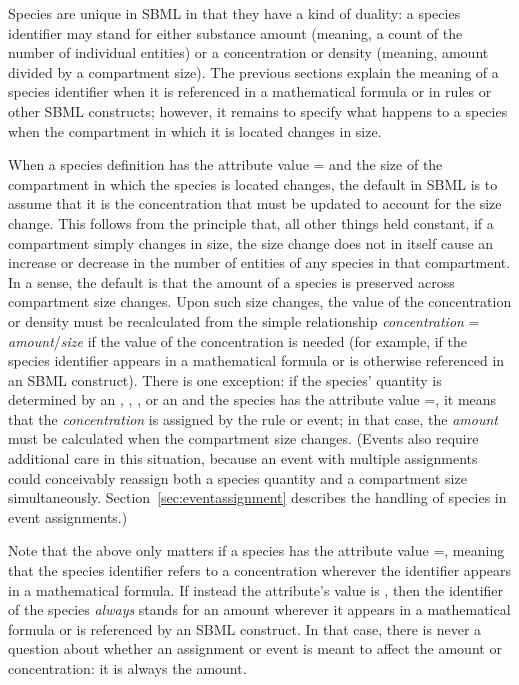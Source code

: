 Species are unique in SBML in that they have a kind of duality: a
species identifier may stand for either substance amount (meaning,
a count of the number of individual entities) or a concentration
or density (meaning, amount divided by a compartment size).  The
previous sections explain the meaning of a species identifier when
it is referenced in a mathematical formula or in rules or other
SBML constructs; however, it remains to specify what happens to a
species when the compartment in which it is located changes in
size.

When a species definition has the attribute value
= and the size of the
compartment in which the species is located changes, the default
in SBML is to assume that it is the concentration that must be
updated to account for the size change.  This follows from the
principle that, all other things held constant, if a compartment
simply changes in size, the size change does not in itself cause
an increase or decrease in the number of entities of any species
in that compartment.  In a sense, the default is that the amount
of a species is preserved across compartment size changes.  Upon
such size changes, the value of the concentration or density must
be recalculated from the simple relationship \emph{concentration}
= \emph{amount}/\emph{size} if the value of the concentration is
needed (for example, if the species identifier appears in a
mathematical formula or is otherwise referenced in an SBML
construct).  There is one exception: if the species' quantity is
determined by an \AssignmentRule, \RateRule, \AlgebraicRule, or an
\EventAssignment and the species has the attribute value
=, it means that the
\emph{concentration} is assigned by the rule or event; in that
case, the \emph{amount} must be calculated when the compartment
size changes.  (Events also require additional care in this
situation, because an event with multiple assignments could
conceivably reassign both a species quantity and a compartment
size simultaneously.  Section~\ref{sec:eventassignment} describes
the handling of species in event assignments.)

Note that the above only matters if a species has the attribute
value =, meaning that the
species identifier refers to a concentration wherever the
identifier appears in a mathematical formula.  If instead the
attribute's value is , then the identifier of the
species \emph{always} stands for an amount wherever it appears in
a mathematical formula or is referenced by an SBML construct.  In
that case, there is never a question about whether an assignment
or event is meant to affect the amount or concentration: it is
always the amount.

